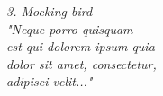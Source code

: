 \clearpage
\thispagestyle{empty}

\vspace*{\fill}

\begin{flushright}
    \itshape
    3. Mocking bird \\[0.5cm]

    "Neque porro quisquam \\
    est qui dolorem ipsum quia \\
    dolor sit amet, consectetur, \\
    adipisci velit..."
\end{flushright}

\clearpage
